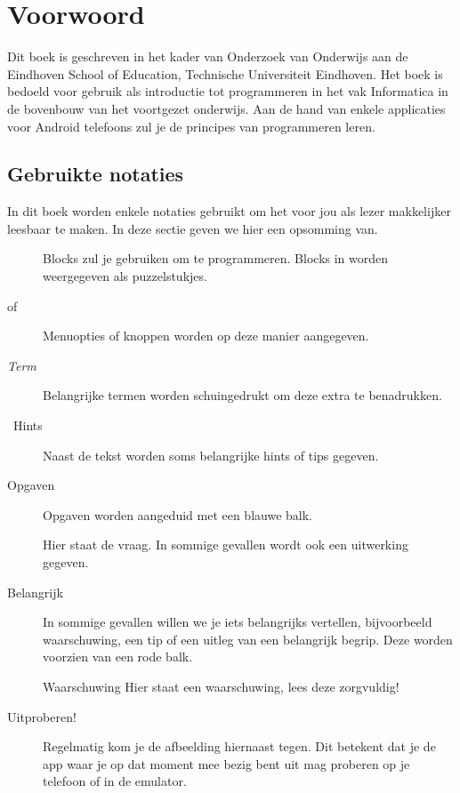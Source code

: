 \chapter*{Voorwoord}

Dit boek is geschreven in het kader van Onderzoek van Onderwijs aan de Eindhoven School of Education, Technische Universiteit Eindhoven. Het boek is bedoeld voor gebruik als introductie tot programmeren in het vak Informatica in de bovenbouw van het voortgezet onderwijs. Aan de hand van enkele applicaties voor Android telefoons zul je de principes van programmeren leren.

\section*{Gebruikte notaties}
In dit boek worden enkele notaties gebruikt om het voor jou als lezer makkelijker leesbaar te maken. In deze sectie geven we hier een opsomming van.

\begin{description}
   \item[] Blocks zul je gebruiken om te programmeren. Blocks in \ai worden weergegeven als puzzelstukjes. 
   \item[ of ] Menuopties of knoppen worden op deze manier aangegeven.
   \item[\emph{Term}] Belangrijke termen worden schuingedrukt om deze extra te benadrukken.
   \item[\lefthand\ Hints] Naast de tekst worden soms belangrijke hints of tips gegeven.
   \item[Opgaven] Opgaven worden aangeduid met een blauwe balk. 
     \begin{opgave}
       \opgVraag
	Hier staat de vraag.
       \opgUitwerking
         In sommige gevallen wordt ook een uitwerking gegeven.
     \end{opgave}
   \item[Belangrijk] In sommige gevallen willen we je iets belangrijks vertellen, bijvoorbeeld waarschuwing, een tip of een uitleg van een belangrijk begrip. Deze worden voorzien van een rode balk.
     \begin{derivation}{Waarschuwing}
       Hier staat een waarschuwing, lees deze zorgvuldig!
      \end{derivation}
    \item[Uitproberen!] \runOpTelefoon{} Regelmatig kom je de afbeelding hiernaast tegen. Dit betekent dat je de app waar je op dat moment mee bezig bent uit mag proberen op je telefoon of in de emulator.
\end{description}